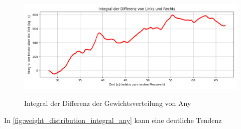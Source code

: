 
\begin{figure}
  \centering
  \includegraphics[width=0.8\linewidth]{img/pyplots/Integral der Differenz - Any.png}\\
  \caption{Integral der Differenz der Gewichtsverteilung von Any}
  \label{fig:weight_distribution_integral_any}
\end{figure}

In \autoref{fig:weight_distribution_integral_any} kann eine deutliche Tendenz 


